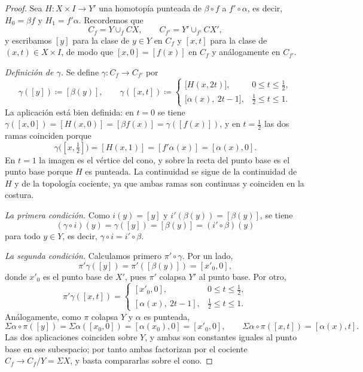 \begin{proof}
Sea $H\colon X\times I\longrightarrow Y'$ una homotopía punteada de $\beta\circ f$ a $f'\circ\alpha$, es decir, $H_0=\beta f$ y $H_1=f'\alpha$. Recordemos que
\[
C_f=Y\cup_f CX,\qquad C_{f'}=Y'\cup_{f'}CX',
\]
y escribamos $[y]$ para la clase de $y\in Y$ en $C_f$ y $[x,t]$ para la clase de $(x,t)\in X\times I$, de modo que $[x,0]=[f(x)]$ en $C_f$ y análogamente en $C_{f'}$.

\emph{Definición de $\gamma$.} Se define $\gamma\colon C_f\to C_{f'}$ por
\[
\gamma([y])\coloneqq[\beta(y)],
\qquad
\gamma([x,t])\coloneqq
\begin{cases}
\bigl[H(x,2t)\bigr], & 0\le t\le\tfrac12,\\[4pt]
\bigl[\alpha(x),\ 2t-1\bigr], & \tfrac12\le t\le1 .
\end{cases}
\]
La aplicación está bien definida: en $t=0$ se tiene $\gamma([x,0])=[H(x,0)]=[\beta f(x)]=\gamma([f(x)])$, y en $t=\tfrac12$ las dos ramas coinciden porque
\[
\gamma\bigl([x,\tfrac12]\bigr)=[H(x,1)]=[f'\alpha(x)]=[\alpha(x),0].
\]
En $t=1$ la imagen es el vértice del cono, y sobre la recta del punto base es el punto base porque $H$ es punteada. La continuidad se sigue de la continuidad de $H$ y de la topología cociente, ya que ambas ramas son continuas y coinciden en la costura.

\emph{La primera condición.} Como $i(y)=[y]$ y $i'(\beta(y))=[\beta(y)]$, se tiene
\[
(\gamma\circ i)(y)=\gamma([y])=[\beta(y)]=(i'\circ\beta)(y)
\]
para todo $y\in Y$, es decir, $\gamma\circ i=i'\circ\beta$.

\emph{La segunda condición.} Calculamos primero $\pi'\circ\gamma$. Por un lado,
\[
\pi'\gamma([y])=\pi'([\beta(y)])=[x'_0,0],
\]
donde $x'_0$ es el punto base de $X'$, pues $\pi'$ colapsa $Y'$ al punto base. Por otro,
\[
\pi'\gamma([x,t])=
\begin{cases}
[x'_0,0], & 0\le t\le\tfrac12,\\[4pt]
[\alpha(x),\ 2t-1], & \tfrac12\le t\le1 .
\end{cases}
\]
Análogamente, como $\pi$ colapsa $Y$ y $\alpha$ es punteada,
\[
\Sigma\alpha\circ\pi([y])=\Sigma\alpha([x_0,0])=[\alpha(x_0),0]=[x'_0,0],
\qquad
\Sigma\alpha\circ\pi([x,t])=[\alpha(x),t].
\]
Las dos aplicaciones coinciden sobre $Y$, y ambas son constantes iguales al punto base en ese subespacio; por tanto ambas factorizan por el cociente $C_f\to C_f/Y=\Sigma X$, y basta compararlas sobre el cono.


\end{proof}
